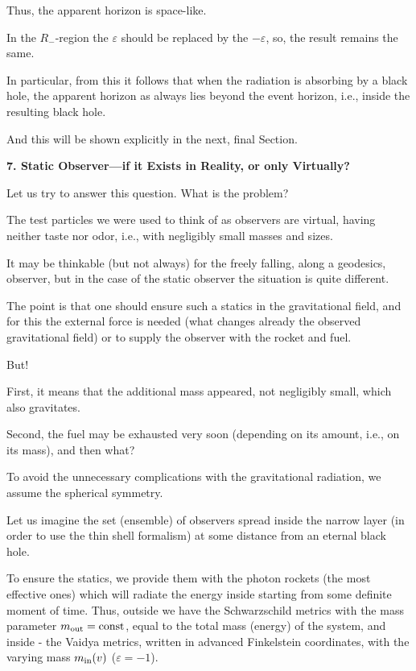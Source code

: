 Thus, the apparent horizon is space-like. 

In the $R_-$-region the $\varepsilon$ should be replaced by the $- \varepsilon $, so, the result remains the same. 

In particular, from this it follows that when the radiation is absorbing by a black hole, the apparent horizon as always lies beyond the event horizon, i.e., inside the resulting black hole. 

And this will be shown explicitly in the next, final Section.



\smallskip



\textbf{7. Static Observer---if it Exists in Reality, or only Virtually?}



Let us try to answer this question. What is the problem? 

The test particles we were used to think of as observers are virtual, having neither taste nor odor, i.e., with negligibly small masses and sizes. 

It may be thinkable (but not always) for the freely falling, along a geodesics, observer, but in the case of the static observer the situation is quite different. 

The point is that one should ensure such a statics in the gravitational field, and for this the external force is needed (what changes already the observed gravitational field) or to supply the observer with the rocket and fuel. 

But! 

First, it means that the additional mass appeared, not negligibly small, which also gravitates. 

Second, the fuel may be exhausted very soon (depending on its amount, i.e., on its mass), and then what?



To avoid the unnecessary complications with the gravitational radiation, we assume the spherical symmetry. 

Let us imagine the set (ensemble) of observers spread inside the narrow layer (in order to use the thin shell formalism)  at some distance from an eternal black hole. 

To ensure the statics, we provide them with the photon rockets (the most effective ones) which will radiate the energy inside starting from some definite moment of time. Thus, outside we have the Schwarzschild metrics with the mass parameter $m_{\rm out} = \rm const$, equal to the total mass (energy) of the system, and inside - the Vaidya metrics, written in advanced  Finkelstein coordinates, with the varying mass $m_{\rm in}(v)$  ($\varepsilon = - 1$). 

